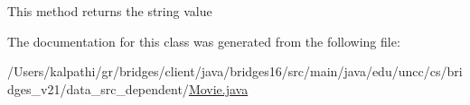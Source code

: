 This method returns the string value 

The documentation for this class was generated from the following file\+:\begin{DoxyCompactItemize}
\item 
/\+Users/kalpathi/gr/bridges/client/java/bridges16/src/main/java/edu/uncc/cs/bridges\+\_\+v21/data\+\_\+src\+\_\+dependent/\hyperlink{_movie_8java}{Movie.\+java}\end{DoxyCompactItemize}

